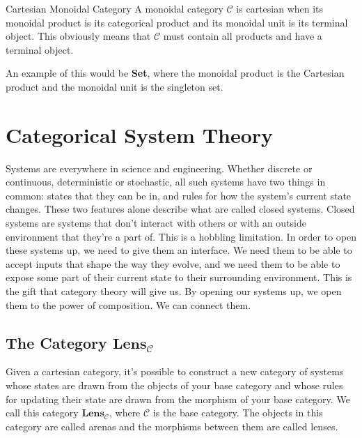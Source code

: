 \documentclass[12pt]{article}
\newcounter{examp}
\begin{document}
\begin{definition}{Cartesian Monoidal Category}{}
    A monoidal category $\mathcal{C}$ is cartesian when its monoidal product is its categorical product and its monoidal unit is its terminal object.
    This obviously means that $\mathcal{C}$ must contain all products and have a terminal object.
\end{definition}
An example of this would be \textbf{Set}, where the monoidal product is the Cartesian product and the monoidal unit is the singleton set.






\section*{Categorical System Theory}
Systems are everywhere in science and engineering.
Whether discrete or continuous, deterministic or stochastic, all such systems have two things in common: states that they can be in, and rules for how the system's current state changes.
These two features alone describe what are called closed systems.
Closed systems are systems that don't interact with others or with an outside environment that they're a part of.
This is a hobbling limitation.
In order to open these systems up, we need to give them an interface.
We need them to be able to accept inputs that shape the way they evolve, and we need them to be able to expose some part of their current state to their surrounding environment.
This is the gift that category theory will give us.
By opening our systems up, we open them to the power of composition.
We can connect them.




\subsection*{The Category $\textbf{Lens}_{\mathcal{C}}$}
Given a cartesian category, it's possible to construct a new category of systems whose states are drawn from the objects of your base category and whose rules for updating their state are drawn from the morphism of your base category.
We call this category $\textbf{Lens}_{\mathcal{C}}$, where $\mathcal{C}$ is the base category.
The objects in this category are called arenas and the morphisms between them are called lenses.
\end{document}
